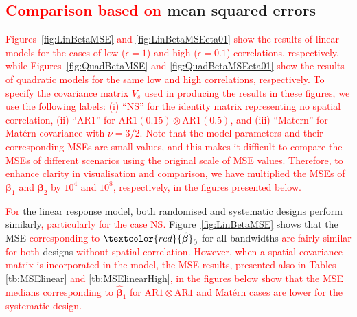 \documentclass[a4paper]{article} 	%
\newcommand{\Matern}{Mat\'ern }
\newcommand{\AR}{\mathrm{AR1}}
\newcommand{\revision}[1]{\textcolor{red}{#1}}
\newcommand{\zc}[1]{\textcolor{red}{#1}}
\begin{document}

\subsection{\revision{Comparison based on} mean squared errors}\label{Sec:MSE}


\revision{Figures~\ref{fig:LinBetaMSE} and \ref{fig:LinBetaMSEeta01} show the results of linear models for the cases of low ($\epsilon = 1$) and high ($\epsilon = 0.1$) correlations, respectively, while Figures~\ref{fig:QuadBetaMSE} and \ref{fig:QuadBetaMSEeta01} show the results of quadratic models for the same low and high correlations, respectively. To specify the covariance matrix $V_s$ used in producing the results in these figures, we use the following labels: (i) ``NS'' for the identity matrix representing no spatial correlation, (ii) ``AR1'' for $\AR(0.15)\otimes \AR(0.5)$, and (iii) ``Matern'' for \Matern covariance with $\nu=3/2$.} \zc{Note that the model parameters and their corresponding MSEs are small values, and this makes it difficult to compare the MSEs of different scenarios using the original scale of MSE values. Therefore, to enhance clarity in visualisation and comparison, we have multiplied the MSEs of $\bm{\beta}_1$ and $\bm{\beta}_2$ by $10^4$ and $10^8$, respectively, in the figures presented below. }



\revision{For} the linear response model, both randomised and systematic designs perform similarly\revision{, particularly for the case NS.} Figure~\ref{fig:LinBetaMSE} shows that the MSE \revision{corresponding to} $\zc{\hat{\bm{\beta}}}_0$ for all bandwidths \revision{are fairly similar for both} designs \zc{without spatial correlation}. \zc{However, when a spatial covariance matrix is incorporated in the model, the MSE results, presented also in Tables \ref{tb:MSElinear} and \ref{tb:MSElinearHigh}, in the figures below show that the MSE medians corresponding to $\hat{\bm{\beta}}_1$ for $\AR\otimes\AR$ and \Matern cases are lower for the systematic design.} 
\end{document}
